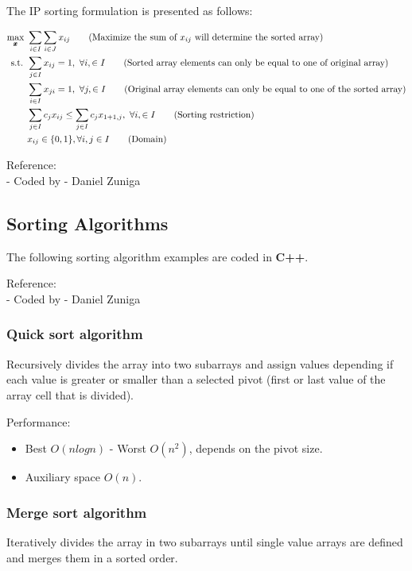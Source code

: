 \documentclass[10pt,bezier]{article}
\begin{document}
The IP sorting formulation is presented as follows:

\begin{subequations}
    \begin{align}
    \max_{\pmb{x}}~& \sum_{i \in I} \sum_{i \in J} x_{ij} \tag{Maximize the sum of $x_{ij}$ will determine the sorted array}\\
    \text{s.t. } &  \sum_{j \in I} x_{ij} = 1,~\forall i, \in I \tag{Sorted array elements can only be equal to one of original array}\\
                 & \sum_{i \in I} x_{ji} = 1,~\forall j, \in I \tag{Original array elements can only be equal to one of the sorted array}\\
                 & \sum_{j \in I} c_j x_{ij} \leq  \sum_{j \in I} c_j x_{1+1, j} ,~\forall i, \in I \tag{Sorting restriction}\\
                 & x_{ij} \in \{0,1\}, \forall i, j \in I  \tag{Domain}
    \end{align}
\end{subequations}


\noindent Reference:\\
- Coded by - Daniel Zuniga

\newpage
\subsection{Sorting Algorithms} \label{section5.2}
The following sorting algorithm examples are coded in {\color{blue}\textbf{C++}}.

\noindent Reference:\\
- Coded by - Daniel Zuniga

\subsubsection{Quick sort algorithm} \label{section5.2.2}
Recursively divides the array into two subarrays and assign values depending if each value is greater or smaller than a selected pivot (first or last value of the array cell that is divided).

Performance:
\begin{itemize}
  \item Best $O(n log n)$ - Worst $O(n^2)$, depends on the pivot size.
  \item Auxiliary space $O(n)$.
\end{itemize}

\subsubsection{Merge sort algorithm} \label{section5.2.3}
Iteratively divides the array in two subarrays until single value arrays are defined and merges them in a sorted order.\\
\end{document}
